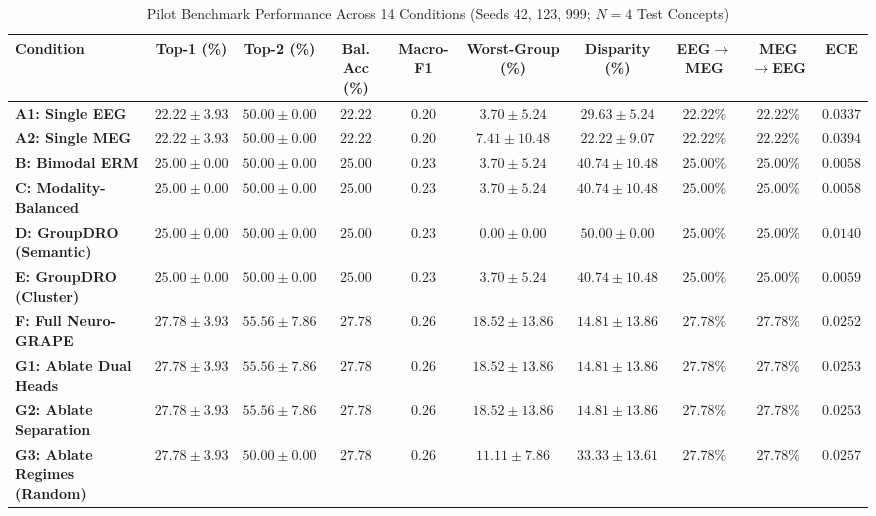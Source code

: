 \documentclass[conference]{IEEEtran}
\begin{document}
\begin{table}[t]
\centering
\caption{Pilot Benchmark Performance Across 14 Conditions (Seeds 42, 123, 999; $N=4$ Test Concepts)}
\label{tab:pilot}
\begin{tabular}{lccccccccc}
\toprule
\textbf{Condition} & \textbf{Top-1 (\%)} & \textbf{Top-2 (\%)} & \textbf{Bal. Acc (\%)} & \textbf{Macro-F1} & \textbf{Worst-Group (\%)} & \textbf{Disparity (\%)} & \textbf{EEG$\to$MEG} & \textbf{MEG$\to$EEG} & \textbf{ECE} \\
\midrule
\textbf{A1: Single EEG} & $22.22 \pm 3.93$ & $50.00 \pm 0.00$ & $22.22$ & $0.20$ & $3.70 \pm 5.24$ & $29.63 \pm 5.24$ & $22.22\%$ & $22.22\%$ & $0.0337$ \\
\textbf{A2: Single MEG} & $22.22 \pm 3.93$ & $50.00 \pm 0.00$ & $22.22$ & $0.20$ & $7.41 \pm 10.48$ & $22.22 \pm 9.07$ & $22.22\%$ & $22.22\%$ & $0.0394$ \\
\textbf{B: Bimodal ERM} & $25.00 \pm 0.00$ & $50.00 \pm 0.00$ & $25.00$ & $0.23$ & $3.70 \pm 5.24$ & $40.74 \pm 10.48$ & $25.00\%$ & $25.00\%$ & $0.0058$ \\
\textbf{C: Modality-Balanced} & $25.00 \pm 0.00$ & $50.00 \pm 0.00$ & $25.00$ & $0.23$ & $3.70 \pm 5.24$ & $40.74 \pm 10.48$ & $25.00\%$ & $25.00\%$ & $0.0058$ \\
\textbf{D: GroupDRO (Semantic)} & $25.00 \pm 0.00$ & $50.00 \pm 0.00$ & $25.00$ & $0.23$ & $0.00 \pm 0.00$ & $50.00 \pm 0.00$ & $25.00\%$ & $25.00\%$ & $0.0140$ \\
\textbf{E: GroupDRO (Cluster)} & $25.00 \pm 0.00$ & $50.00 \pm 0.00$ & $25.00$ & $0.23$ & $3.70 \pm 5.24$ & $40.74 \pm 10.48$ & $25.00\%$ & $25.00\%$ & $0.0059$ \\
\midrule
\textbf{F: Full Neuro-GRAPE} & $\mathbf{27.78 \pm 3.93}$ & $\mathbf{55.56 \pm 7.86}$ & $\mathbf{27.78}$ & $\mathbf{0.26}$ & $\mathbf{18.52 \pm 13.86}$ & $\mathbf{14.81 \pm 13.86}$ & $\mathbf{27.78\%}$ & $\mathbf{27.78\%}$ & $\mathbf{0.0252}$ \\
\midrule
\textbf{G1: Ablate Dual Heads} & $27.78 \pm 3.93$ & $55.56 \pm 7.86$ & $27.78$ & $0.26$ & $18.52 \pm 13.86$ & $14.81 \pm 13.86$ & $27.78\%$ & $27.78\%$ & $0.0253$ \\
\textbf{G2: Ablate Separation} & $27.78 \pm 3.93$ & $55.56 \pm 7.86$ & $27.78$ & $0.26$ & $18.52 \pm 13.86$ & $14.81 \pm 13.86$ & $27.78\%$ & $27.78\%$ & $0.0253$ \\
\textbf{G3: Ablate Regimes (Random)} & $27.78 \pm 3.93$ & $50.00 \pm 0.00$ & $27.78$ & $0.26$ & $11.11 \pm 7.86$ & $33.33 \pm 13.61$ & $27.78\%$ & $27.78\%$ & $0.0257$ \\

\end{tabular}
\end{table}
\end{document}

